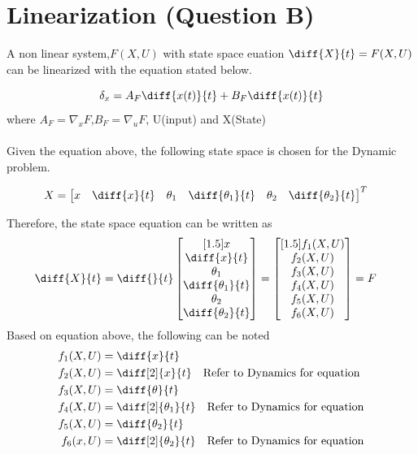 \documentclass[12pt]{article}
\begin{document}
\newpage
\section{Linearization (Question B)}
A non linear system,$F(X,U)$ with state space euation 
$
  \diff{X}{t} = F(X,U)
$
can be linearized with the equation stated below.

\begin{equation}
  \delta _x = A_F \diff{x(t)}{t} + B_F\diff{x(t)}{t}
\end{equation}
where $A_F =\nabla_xF$,$B_F = \nabla_uF$, U(input) and X(State) \\ \\
Given the equation above, the following state space is chosen for the Dynamic problem.

\begin{align}
  X &=
  \begin{bmatrix}
    x& \diff{x}{t} & \theta_1 & \diff{\theta_1}{t} &\theta_2&\diff{\theta_2}{t}
  \end{bmatrix}^T
\end{align}

Therefore, the state space equation can be written as
\begin{align}
  \diff{X}{t}&= \diff{}{t}
  \begin{bmatrix}[1.5]
    x \\
    \diff{x}{t} \\
    \theta_1 \\
    \diff{\theta_1}{t} \\
    \theta_2\\
    \diff{\theta_2}{t}
  \end{bmatrix} 
  =
  \begin{bmatrix}[1.5]
    f_1(X,U)\\
    f_2(X,U)\\
    f_3(X,U)\\
    f_4(X,U)\\
    f_5(X,U)\\
    f_6(X,U)
  \end{bmatrix} = F
\end{align}
Based on equation above, the following can be noted
\begin{align}
  f_1(X,U) &= \diff{x}{t} \\
  f_2(X,U) &= \diff[2]{x}{t} \quad \text{Refer to Dynamics for equation} \\
  f_3(X,U) &= \diff{\theta}{t} \\
  f_4(X,U) &= \diff[2]{\theta_1}{t} \quad \text{Refer to Dynamics for equation} \\
  f_5(X,U) &= \diff{\theta _2}{t}\\
  f_6(x,U) &= \diff[2]{\theta _2}{t}\quad \text{Refer to Dynamics for equation} \\
\end{align}
\end{document}
